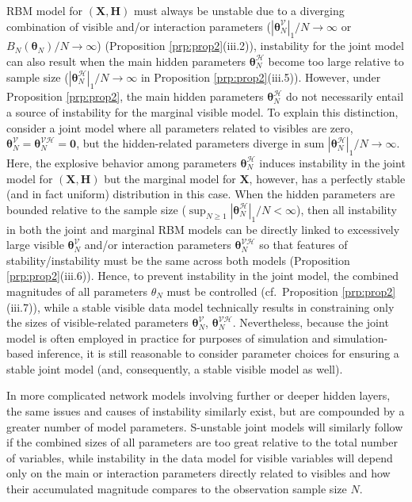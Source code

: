 \documentclass[]{article}
\theoremstyle{definition}
\newcommand{\Gam}{B_{N}(\boldsymbol \theta_N) }
\begin{document}
RBM model for \((\boldsymbol X,\boldsymbol H)\) must always be unstable
due to a diverging combination of visible and/or interaction parameters
(\(|\boldsymbol \theta_N^{\mathcal{V}}|_1/N\to \infty\) or
\(\Gam/N\to \infty\)) (Proposition \ref{prp:prop2}(iii.2)), instability
for the joint model can also result when the main hidden parameters
\(\boldsymbol \theta_N^{\mathcal{H}}\) become too large relative to
sample size (\(|\boldsymbol \theta_N^{\mathcal{H}}|_1/N\to \infty\) in
Proposition \ref{prp:prop2}(iii.5)). However, under Proposition
\ref{prp:prop2}, the main hidden parameters
\(\boldsymbol \theta_N^{\mathcal{H}}\) do not necessarily entail a
source of instability for the marginal visible model. To explain this
distinction, consider a joint model where all parameters related to
visibles are zero,
\(\boldsymbol \theta_N^{\mathcal{V}}= \boldsymbol \theta_N^{\mathcal{VH}}=\boldsymbol 0\),
but the hidden-related parameters diverge in sum
\(|\boldsymbol \theta_N^{\mathcal{H}}|_1/N\to \infty\). Here, the
explosive behavior among parameters
\(\boldsymbol \theta_N^{\mathcal{H}}\) induces instability in the joint
model for \((\boldsymbol X, \boldsymbol H)\) but the marginal model for
\(\boldsymbol X\), however, has a perfectly stable (and in fact uniform)
distribution in this case. When the hidden parameters are bounded
relative to the sample size
(\(\sup_{N\geq 1} |\boldsymbol \theta_N^{\mathcal{H}}|_1/N<\infty\)),
then all instability in both the joint and marginal RBM models can be
directly linked to excessively large visible
\(\boldsymbol \theta_N^{\mathcal{V}}\) and/or interaction parameters
\(\boldsymbol \theta_N^{\mathcal{VH}}\) so that features of
stability/instability must be the same across both models (Proposition
\ref{prp:prop2}(iii.6)). Hence, to prevent instability in the joint
model, the combined magnitudes of all parameters \(\theta_N\) must be
controlled (cf.~Proposition \ref{prp:prop2}(iii.7)), while a stable
visible data model technically results in constraining only the sizes of
visible-related parameters \(\boldsymbol \theta_N^{\mathcal{V}}\),
\(\boldsymbol \theta_N^{\mathcal{VH}}\). Nevertheless, because the joint
model is often employed in practice for purposes of simulation and
simulation-based inference, it is still reasonable to consider parameter
choices for ensuring a stable joint model (and, consequently, a stable
visible model as well).

In more complicated network models involving further or deeper hidden
layers, the same issues and causes of instability similarly exist, but
are compounded by a greater number of model parameters. S-unstable joint
models will similarly follow if the combined sizes of all parameters are
too great relative to the total number of variables, while instability
in the data model for visible variables will depend only on the main or
interaction parameters directly related to visibles and how their
accumulated magnitude compares to the observation sample size \(N\).
\end{document}
